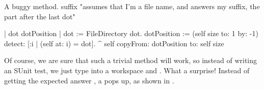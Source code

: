 \documentclass[a4paper,10pt,twoside]{book}
\begin{document}

\needspace{10ex}
\begin{method}[buggy]{A buggy method.}
suffix
	"assumes that I'm a file name, and answers my suffix, the part after the last dot"

	| dot dotPosition |
	dot := FileDirectory dot.
	dotPosition := (self size to: 1 by: -1) detect: [:i | (self at: i) = dot].
	^ self copyFrom: dotPosition to: self size
\end{method}

Of course, we are sure that such a trivial method will work, so instead of writing an SUnit test, we just type  into a workspace and .
What a surprise!
Instead of getting the expected answer , a  pops up, as shown in .
\end{document}
